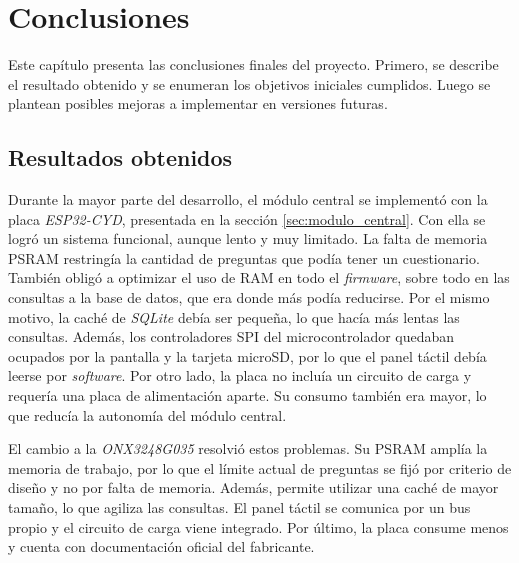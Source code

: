 
\chapter{Conclusiones} %

\label{Chapter4} %
\label{conclusiones}


Este capítulo presenta las conclusiones finales del proyecto. Primero, se describe el resultado obtenido y se enumeran los objetivos iniciales cumplidos. Luego se plantean posibles mejoras a implementar en versiones futuras.


\section{Resultados obtenidos}

Durante la mayor parte del desarrollo, el módulo central se implementó con la placa \emph{ESP32-CYD}, presentada en la sección \ref{sec:modulo_central}. Con ella se logró un sistema funcional, aunque lento y muy limitado. La falta de memoria PSRAM restringía la cantidad de preguntas que podía tener un cuestionario. También obligó a optimizar el uso de RAM en todo el \emph{firmware}, sobre todo en las consultas a la base de datos, que era donde más podía reducirse. Por el mismo motivo, la caché de \emph{SQLite} debía ser pequeña, lo que hacía más lentas las consultas. Además, los controladores SPI del microcontrolador quedaban ocupados por la pantalla y la tarjeta microSD, por lo que el panel táctil debía leerse por \emph{software}. Por otro lado, la placa no incluía un circuito de carga y requería una placa de alimentación aparte. Su consumo también era mayor, lo que reducía la autonomía del módulo central.

El cambio a la \emph{ONX3248G035} resolvió estos problemas. Su PSRAM amplía la memoria de trabajo, por lo que el límite actual de preguntas se fijó por criterio de diseño y no por falta de memoria. Además, permite utilizar una caché de mayor tamaño, lo que agiliza las consultas. El panel táctil se comunica por un bus propio y el circuito de carga viene integrado. Por último, la placa consume menos y cuenta con documentación oficial del fabricante.

